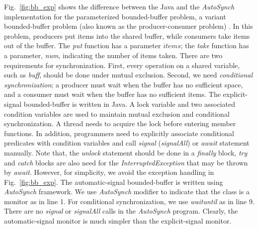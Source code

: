 \documentclass[preprint]{sigplanconf}
\begin{document}

Fig.~\ref{fig:bb_exp} shows the difference between 
the Java and the {\em AutoSynch} implementation for the parameterized bounded-buffer
problem, a variant bounded-buffer problem (also known as the producer-consumer problem) \cite{dijk65, dijk71}. 
In this problem, producers put items into the shared buffer, while 
consumers take items out of the buffer. The {\em put} function has a parameter
$items$; the {\em take} function has a parameter, {\em num}, 
indicating the number of items taken. There are two requirements for synchronization.
First, every operation on a shared variable, such as {\em buff}, should be done 
under mutual exclusion. Second, we need {\em conditional synchronization};
a producer must wait when the buffer has no sufficient space, and a consumer 
must wait when the buffer has no sufficient items. The explicit-signal 
bounded-buffer is written in Java. A lock variable and two associated condition 
variables are used to maintain mutual exclusion and conditional 
synchronization. A thread needs to acquire the lock before entering member
functions. In addition, programmers need to explicitly associate conditional 
predicates with condition variables and call {\em signal} ({\em signalAll}) or
{\em await} statement manually. Note that, the {\em unlock} statement should be 
done in a {\em finally} block, {\em try} and {\em catch} blocks are also need for the 
{\em InterruptedException} that may be thrown by {\em await}. However, for
simplicity, we avoid the exception handling in Fig.~\ref{fig:bb_exp}. 
The automatic-signal bounded-buffer is written using {\em AutoSynch} framework.
We use {\em AutoSynch} modifier to indicate that the class is a monitor as in line 
1. For conditional synchronization,  we use {\em waituntil} as in line 9. There are 
no {\em signal} or {\em signalAll} calls in the {\em AutoSynch} program.
Clearly, the automatic-signal monitor is
much simpler than the explicit-signal monitor. 
\end{document}

